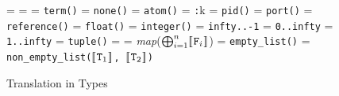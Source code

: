\begin{figure} [H]
   \begin{translationfig}
      \dsb{\alpha} = \alpha
      \nl
       = 
      \nl
       = \texttt{term()}
      \nl
       = \texttt{none()}
      \nl
       = \texttt{atom()}
      \nl
       = \texttt{:}k
      \nl
       = \texttt{pid()}
      \nl
       = \texttt{port()}
      \nl
       = \texttt{reference()}
      \nl
       = \texttt{float()}
      \nl
       = \texttt{integer()}
      \nl
       = \texttt{infty..-1}
      \nl
       = \texttt{0..infty}
      \nl
       = \texttt{1..infty}
      \nl
       = \texttt{tuple()}
      \nl
      \dsb{\tuple{\ov{\TST}}} = \tuple{\dsb{\ov{\TST}}}
      \nl
       = \textsf{\textsl{map}($\bigoplus_{i=1}^{n}[\![\hspace{.07em}\texttt{F}_i\hspace{.07em}]\!]$)}
      \nl
      \dsb{\texttt{[]}} = \texttt{empty\_list()}
      \nl
       = \texttt{non\_empty\_list($[\![\hspace{.07em}\texttt{T}_1\hspace{.07em}]\!]$, $[\![\hspace{.07em}\texttt{T}_2\hspace{.07em}]\!]$)}
   \end{translationfig}
   \caption{Translation in Types}
   \label{app:translation-in-types}
\end{figure}

